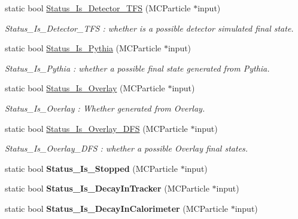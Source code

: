 \begin{DoxyCompactItemize}
static bool \hyperlink{classToolSet_1_1CMC_a23a38c3094037dd6660223494c8a5827}{Status\_\-Is\_\-Detector\_\-TFS} (MCParticle $\ast$input)
\begin{DoxyCompactList}\small\item\em Status\_\-Is\_\-Detector\_\-TFS : whether is a possible detector simulated final state. \item\end{DoxyCompactList}\item 
static bool \hyperlink{classToolSet_1_1CMC_a3fbb915477cbbdca4193b8b2ff8cd356}{Status\_\-Is\_\-Pythia} (MCParticle $\ast$input)
\begin{DoxyCompactList}\small\item\em Status\_\-Is\_\-Pythia : whether a possible final state generated from Pythia. \item\end{DoxyCompactList}\item 
static bool \hyperlink{classToolSet_1_1CMC_a9d3659a1fd4bad33a54c08769902e998}{Status\_\-Is\_\-Overlay} (MCParticle $\ast$input)
\begin{DoxyCompactList}\small\item\em Status\_\-Is\_\-Overlay : Whether generated from Overlay. \item\end{DoxyCompactList}\item 
static bool \hyperlink{classToolSet_1_1CMC_acb83c834c9e5e1c33f8c2514e4c40d93}{Status\_\-Is\_\-Overlay\_\-DFS} (MCParticle $\ast$input)
\begin{DoxyCompactList}\small\item\em Status\_\-Is\_\-Overlay\_\-DFS : whether a possible Overlay final states. \item\end{DoxyCompactList}\item 
\hypertarget{classToolSet_1_1CMC_aac0eed5c22431cfc5e9c32d9bc48b0d7}{
static bool {\bfseries Status\_\-Is\_\-Stopped} (MCParticle $\ast$input)}
\label{classToolSet_1_1CMC_aac0eed5c22431cfc5e9c32d9bc48b0d7}

\item 
\hypertarget{classToolSet_1_1CMC_a2b903f56e1a2c0635e722a47d5e3e87f}{
static bool {\bfseries Status\_\-Is\_\-DecayInTracker} (MCParticle $\ast$input)}
\label{classToolSet_1_1CMC_a2b903f56e1a2c0635e722a47d5e3e87f}

\item 
\hypertarget{classToolSet_1_1CMC_ad59fb18ae62349bf343ad165950f776a}{
static bool {\bfseries Status\_\-Is\_\-DecayInCalorimeter} (MCParticle $\ast$input)}
\label{classToolSet_1_1CMC_ad59fb18ae62349bf343ad165950f776a}


\end{DoxyCompactItemize}
